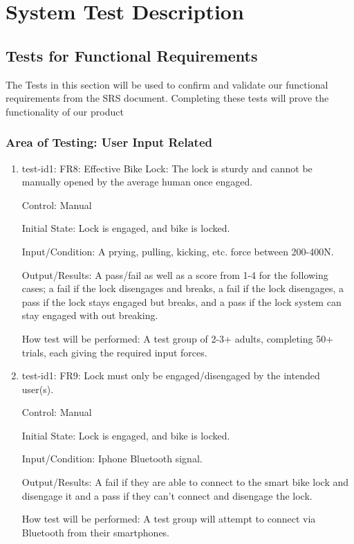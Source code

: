 \documentclass[12pt, titlepage]{article}
\begin{document}

\section{System Test Description}
	
\subsection{Tests for Functional Requirements}

The Tests in this section will be used to confirm and validate our functional requirements from the SRS document. Completing these tests will prove the functionality of our product

\subsubsection{Area of Testing: User Input Related}

\begin{enumerate}

\item{test-id1: FR8: Effective Bike Lock: The lock is sturdy and cannot be manually opened by the average human once engaged. \\}

Control: Manual

Initial State: Lock is engaged, and bike is locked.

Input/Condition: A prying, pulling, kicking, etc. force between 200-400N.

Output/Results: A pass/fail as well as a score from 1-4 for the following cases; a fail if the lock disengages and breaks, a fail if the lock disengages, a pass if the lock stays engaged but breaks, and a pass if the lock system can stay engaged with out breaking.

How test will be performed: A test group of 2-3+ adults, completing 50+ trials, each giving the required input forces.

\item{test-id1: FR9: Lock must only be engaged/disengaged by the intended user(s). \\}

Control: Manual

Initial State: Lock is engaged, and bike is locked.

Input/Condition: Iphone Bluetooth signal.

Output/Results: A fail if they are able to connect to the smart bike lock and disengage it and a pass if they can’t connect and disengage the lock.

How test will be performed: A test group will attempt to connect via Bluetooth from their smartphones.

\end{enumerate}
\end{document}

